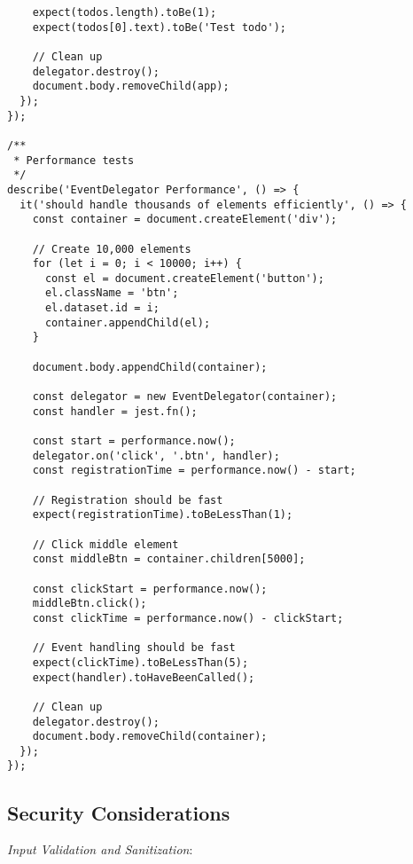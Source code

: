 \documentclass[11pt]{article}
\begin{document}
\begin{verbatim}
    expect(todos.length).toBe(1);
    expect(todos[0].text).toBe('Test todo');
    
    // Clean up
    delegator.destroy();
    document.body.removeChild(app);
  });
});

/**
 * Performance tests
 */
describe('EventDelegator Performance', () => {
  it('should handle thousands of elements efficiently', () => {
    const container = document.createElement('div');
    
    // Create 10,000 elements
    for (let i = 0; i < 10000; i++) {
      const el = document.createElement('button');
      el.className = 'btn';
      el.dataset.id = i;
      container.appendChild(el);
    }
    
    document.body.appendChild(container);
    
    const delegator = new EventDelegator(container);
    const handler = jest.fn();
    
    const start = performance.now();
    delegator.on('click', '.btn', handler);
    const registrationTime = performance.now() - start;
    
    // Registration should be fast
    expect(registrationTime).toBeLessThan(1);
    
    // Click middle element
    const middleBtn = container.children[5000];
    
    const clickStart = performance.now();
    middleBtn.click();
    const clickTime = performance.now() - clickStart;
    
    // Event handling should be fast
    expect(clickTime).toBeLessThan(5);
    expect(handler).toHaveBeenCalled();
    
    // Clean up
    delegator.destroy();
    document.body.removeChild(container);
  });
});
\end{verbatim}
\subsection{Security Considerations}
\label{sec:org5be059c}

\emph{Input Validation and Sanitization}:
\end{document}
